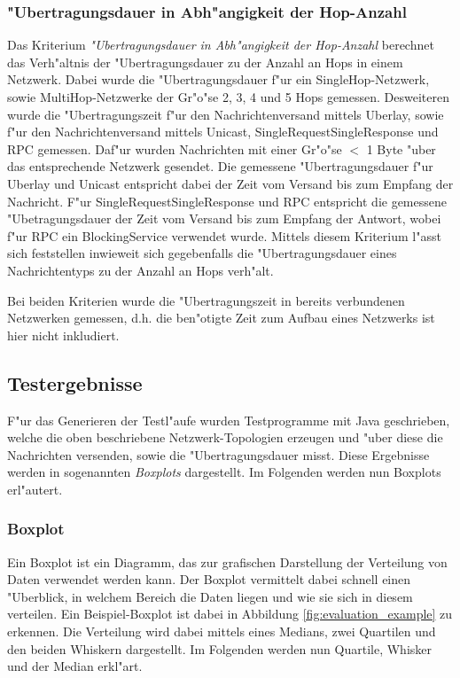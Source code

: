 \subsubsection{"Ubertragungsdauer in Abh"angigkeit der Hop-Anzahl}

Das Kriterium \emph{"Ubertragungsdauer in Abh"angigkeit der Hop-Anzahl} berechnet das Verh"altnis der "Ubertragungsdauer zu der Anzahl an Hops in einem Netzwerk. Dabei wurde die "Ubertragungsdauer f"ur ein SingleHop-Netzwerk, sowie MultiHop-Netzwerke der Gr"o"se 2, 3, 4 und 5 Hops gemessen. Desweiteren wurde die "Ubertragungszeit f"ur den Nachrichtenversand mittels Uberlay, sowie f"ur den Nachrichtenversand mittels Unicast, SingleRequestSingleResponse und RPC gemessen. Daf"ur wurden Nachrichten mit einer Gr"o"se $<$ 1 Byte "uber das entsprechende Netzwerk gesendet. Die gemessene "Ubertragungsdauer f"ur Uberlay und Unicast entspricht dabei der Zeit vom Versand bis zum Empfang der Nachricht. F"ur SingleRequestSingleResponse und RPC entspricht die gemessene "Ubetragungsdauer der Zeit vom Versand bis zum Empfang der Antwort, wobei f"ur RPC ein BlockingService verwendet wurde. Mittels diesem Kriterium l"asst sich feststellen inwieweit sich gegebenfalls die "Ubertragungsdauer eines Nachrichtentyps zu der Anzahl an Hops verh"alt.  

Bei beiden Kriterien wurde die "Ubertragungszeit in bereits verbundenen Netzwerken gemessen, d.h. die ben"otigte Zeit zum Aufbau eines Netzwerks ist hier nicht inkludiert. 
\subsection{Testergebnisse}
F"ur das Generieren der Testl"aufe wurden Testprogramme mit Java geschrieben, welche die oben beschriebene Netzwerk-Topologien erzeugen und "uber diese die Nachrichten versenden, sowie die "Ubertragungsdauer misst. Diese Ergebnisse werden in sogenannten \emph{Boxplots} dargestellt. Im Folgenden werden nun Boxplots erl"autert.

\subsubsection{Boxplot}
Ein Boxplot ist ein Diagramm, das zur grafischen Darstellung der Verteilung von Daten verwendet werden kann. Der Boxplot vermittelt dabei schnell einen "Uberblick, in welchem Bereich die Daten liegen und wie sie sich in diesem verteilen. Ein Beispiel-Boxplot ist dabei in Abbildung \ref{fig:evaluation_example} zu erkennen. Die Verteilung wird dabei mittels eines Medians, zwei Quartilen und den beiden Whiskern dargestellt. Im Folgenden werden nun Quartile, Whisker und der Median erkl"art.

